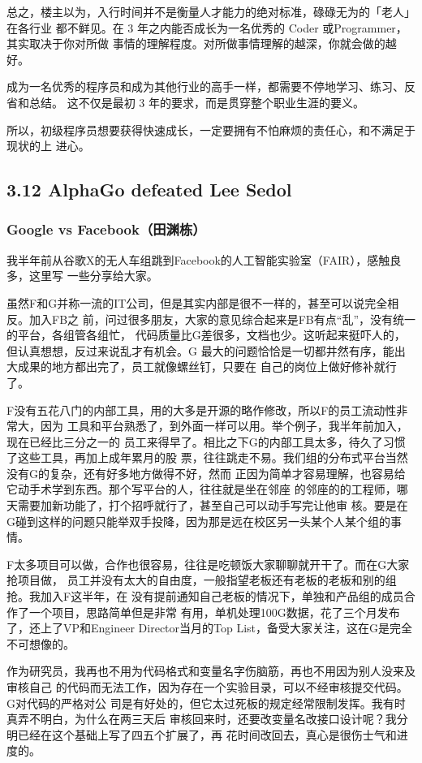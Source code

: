 \documentclass[11pt]{article}
\begin{document}
总之，楼主以为，入行时间并不是衡量人才能力的绝对标准，碌碌无为的「老人」在各行业
都不鲜见。在 3 年之内能否成长为一名优秀的 Coder 或Programmer，其实取决于你对所做
事情的理解程度。对所做事情理解的越深，你就会做的越好。

成为一名优秀的程序员和成为其他行业的高手一样，都需要不停地学习、练习、反省和总结。
这不仅是最初 3 年的要求，而是贯穿整个职业生涯的要义。

所以，初级程序员想要获得快速成长，一定要拥有不怕麻烦的责任心，和不满足于现状的上
进心。
\subsection*{3.12 AlphaGo defeated Lee Sedol}
\label{sec:orgheadline145}
\subsubsection*{Google vs Facebook（田渊栋）}
\label{sec:orgheadline144}
我半年前从谷歌X的无人车组跳到Facebook的人工智能实验室（FAIR），感触良多，这里写
一些分享给大家。

虽然F和G并称一流的IT公司，但是其实内部是很不一样的，甚至可以说完全相反。加入FB之
前，问过很多朋友，大家的意见综合起来是FB有点“乱”，没有统一的平台，各组管各组忙，
代码质量比G差很多，文档也少。这听起来挺吓人的，但认真想想，反过来说乱才有机会。G
最大的问题恰恰是一切都井然有序，能出大成果的地方都出完了，员工就像螺丝钉，只要在
自己的岗位上做好修补就行了。

F没有五花八门的内部工具，用的大多是开源的略作修改，所以F的员工流动性非常大，因为
工具和平台熟悉了，到外面一样可以用。举个例子，我半年前加入，现在已经比三分之一的
员工来得早了。相比之下G的内部工具太多，待久了习惯了这些工具，再加上成年累月的股
票，往往跳走不易。我们组的分布式平台当然没有G的复杂，还有好多地方做得不好，然而
正因为简单才容易理解，也容易给它动手术学到东西。那个写平台的人，往往就是坐在邻座
的邻座的的工程师，哪天需要加新功能了，打个招呼就行了，甚至自己可以动手写完让他审
核。要是在G碰到这样的问题只能举双手投降，因为那是远在校区另一头某个人某个组的事
情。

F太多项目可以做，合作也很容易，往往是吃顿饭大家聊聊就开干了。而在G大家抢项目做，
员工并没有太大的自由度，一般指望老板还有老板的老板和别的组抢。我加入F这半年，在
没有提前通知自己老板的情况下，单独和产品组的成员合作了一个项目，思路简单但是非常
有用，单机处理100G数据，花了三个月发布了，还上了VP和Engineer Director当月的Top
List，备受大家关注，这在G是完全不可想像的。

作为研究员，我再也不用为代码格式和变量名字伤脑筋，再也不用因为别人没来及审核自己
的代码而无法工作，因为存在一个实验目录，可以不经审核提交代码。G对代码的严格对公
司是有好处的，但它太过死板的规定经常限制发挥。我有时真弄不明白，为什么在两三天后
审核回来时，还要改变量名改接口设计呢？我分明已经在这个基础上写了四五个扩展了，再
花时间改回去，真心是很伤士气和进度的。
\end{document}
